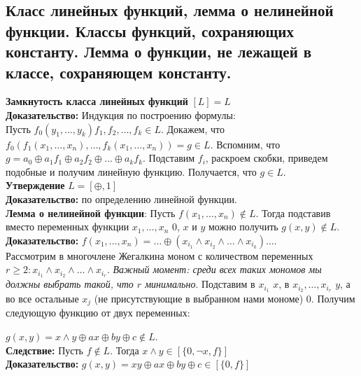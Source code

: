 \subsection{Класс линейных функций, лемма о нелинейной функции. Классы функций, сохраняющих константу. Лемма о функции, не лежащей в классе, сохраняющем константу.}
\textbf{Замкнутость класса линейных функций} $[L] = L$\\

\noindent \textbf{Доказательство:} Индукция по построению формулы:\\

Пусть $f_0(y_1, \ldots, y_k) f_1, f_2, \ldots, f_k \in L$. Докажем, что $f_0 (f_1(x_1,\ldots,x_n),\ldots,f_k(x_1,\ldots,x_n)) = g \in L$.
Вспомним, что $g = a_0 \oplus a_1f_1 \oplus a_2f_2 \oplus \ldots \oplus a_kf_k$. Подставим $f_i$, раскроем скобки, приведем подобные и получим линейную функцию. Получается, что $g \in L$.\\

\textbf{Утверждение} $L = [{\oplus, 1}]$\\

\noindent \textbf{Доказательство:} по определению линейной функции.\\

\textbf{Лемма о нелинейной функции}: Пусть $f(x_1, \ldots, x_n) \notin L$. Тогда подставив вместо переменных функции $x_1, \ldots, x_n$ 0, $x$ и $y$ можно получить $g(x, y) \notin L$.\\

\noindent \textbf{Доказательство:} $f(x_1,\ldots,x_n) = \ldots \oplus (x_{i_1} \wedge x_{i_2} \wedge \ldots \wedge x_{i_k}) \ldots$.\\

Рассмотрим в многочлене Жегалкина моном с количеством переменных $r \ge 2: x_{i_1} \wedge x_{i_2} \wedge \ldots \wedge x_{i_r}$. \textit{Важный момент: среди всех таких мономов мы должны выбрать такой, что $r$ минимально}. Подставим в $x_{i_1}$ $x$, в $x_{i_2}, \ldots, x_{i_r}$ $y$, а во все остальные $x_j$ (не присутствующие в выбранном нами мономе) 0. Получим следующую функцию от двух переменных:

$g(x, y) = x \wedge y \oplus ax \oplus by \oplus c \notin L$.\\

\textbf{Следствие:} Пусть $f \notin L$. Тогда $x \wedge y \in [\{0, \neg x, f\}]$\\

\noindent \textbf{Доказательство:} $g(x, y) = xy \oplus ax \oplus by \oplus c \in [\{0, f\}]$\\

